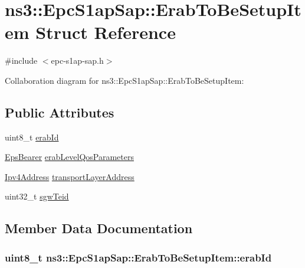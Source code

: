 \hypertarget{structns3_1_1EpcS1apSap_1_1ErabToBeSetupItem}{}\section{ns3\+:\+:Epc\+S1ap\+Sap\+:\+:Erab\+To\+Be\+Setup\+Item Struct Reference}
\label{structns3_1_1EpcS1apSap_1_1ErabToBeSetupItem}


{\ttfamily \#include $<$epc-\/s1ap-\/sap.\+h$>$}



Collaboration diagram for ns3\+:\+:Epc\+S1ap\+Sap\+:\+:Erab\+To\+Be\+Setup\+Item\+:
\subsection*{Public Attributes}
\begin{DoxyCompactItemize}
\item 
uint8\+\_\+t \hyperlink{structns3_1_1EpcS1apSap_1_1ErabToBeSetupItem_aff938a4444e6a15d80ec6317a33919af}{erab\+Id}
\item 
\hyperlink{structns3_1_1EpsBearer}{Eps\+Bearer} \hyperlink{structns3_1_1EpcS1apSap_1_1ErabToBeSetupItem_a8ae1c83db86bbdc5e303cab662f09438}{erab\+Level\+Qos\+Parameters}
\item 
\hyperlink{classns3_1_1Ipv4Address}{Ipv4\+Address} \hyperlink{structns3_1_1EpcS1apSap_1_1ErabToBeSetupItem_a6c0f1e80dc0f78d54f859f0158af24c4}{transport\+Layer\+Address}
\item 
uint32\+\_\+t \hyperlink{structns3_1_1EpcS1apSap_1_1ErabToBeSetupItem_ad716ebafa3da5c8a98fcc544357452dd}{sgw\+Teid}
\end{DoxyCompactItemize}


\subsection{Member Data Documentation}
\subsubsection[{\texorpdfstring{erab\+Id}{erabId}}]{\setlength{\rightskip}{0pt plus 5cm}uint8\+\_\+t ns3\+::\+Epc\+S1ap\+Sap\+::\+Erab\+To\+Be\+Setup\+Item\+::erab\+Id}\hypertarget{structns3_1_1EpcS1apSap_1_1ErabToBeSetupItem_aff938a4444e6a15d80ec6317a33919af}{}\label{structns3_1_1EpcS1apSap_1_1ErabToBeSetupItem_aff938a4444e6a15d80ec6317a33919af}
